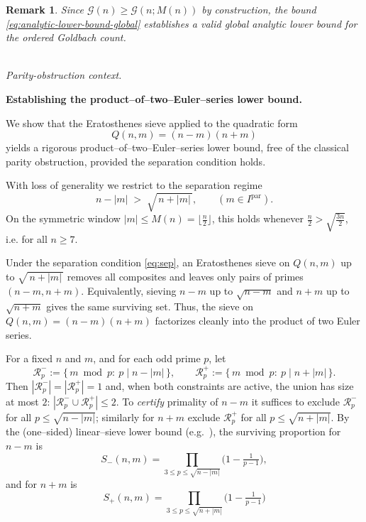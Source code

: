 \documentclass[11pt]{article}
\makeatletter
\theoremstyle{inline}
\newtheorem*{remark}{Remark}
\theoremstyle{break}
\renewenvironment{proof}[1][\proofname]{%
  \par\pushQED{\qed}%
  \normalfont \topsep6\p@\@plus6\p@\relax
  \trivlist
  \item[\hskip\labelsep
        \itshape
    #1\@addpunct{.}]\mbox{}\\  %
}{%
  \popQED\endtrivlist\@endpefalse
}
\theoremstyle{break}
\theoremstyle{break}
\theoremstyle{break}
\theoremstyle{break}
\theoremstyle{break}
\theoremstyle{break}
\theoremstyle{inline}
\makeatother
\begin{document}
\begin{remark}
Since \(\mathcal{G}(n) \ge \mathcal{G}(n;M(n))\) by construction, the bound
\eqref{eq:analytic-lower-bound-global} establishes a valid global
analytic lower bound for the ordered Goldbach count.
\end{remark}

\begin{proof}
\emph{Parity-obstruction context.}

\noindent\textbf{Establishing the product--of--two--Euler--series lower bound.}

We show that the Eratosthenes sieve\cite{FriedlanderIwaniec2010} applied to the quadratic form
\begin{equation}
Q(n,m)=(n-m)(n+m)
\end{equation}
yields a rigorous product--of--two--Euler--series lower bound, free of the
classical parity obstruction\cite{Chen1973, IwaniecKowalski2004}, provided the separation condition holds.

With loss of generality we restrict to the separation regime
\begin{equation}\label{eq:sep}
n-|m|\;>\;\sqrt{\,n+|m|\,}, \qquad (m\in I^{\mathrm{par}}).
\end{equation}
On the symmetric window \(|m|\le M(n)=\lfloor \frac{n}{2} \rfloor\), this holds whenever
\(\frac{n}{2} > \sqrt{\frac{3n}{2}}\), i.e. for all \(n\ge7\).  

Under the separation condition \eqref{eq:sep}, an Eratosthenes sieve on \(Q(n,m)\) up to
\(\sqrt{\,n+|m|\,}\) removes all composites and leaves only pairs of primes
\((n-m,n+m)\). Equivalently, sieving \(n-m\) up to \(\sqrt{n-m}\) and \(n+m\)
up to \(\sqrt{n+m}\) gives the same surviving set.  Thus, the sieve on \(Q(n,m)=(n-m)(n+m)\)
factorizes cleanly into the product of two Euler series.\cite{Vaughan1997}

For a fixed \(n\) and \(m\), and for each odd prime \(p\), let
\begin{equation}
\mathcal R_p^-:=\{\,m\bmod p:\ p\mid n-|m|\,\},\qquad
\mathcal R_p^+:=\{\,m\bmod p:\ p\mid n+|m|\,\}.
\end{equation}
Then \(|\mathcal R_p^-|=|\mathcal R_p^+|=1\) and, when both constraints are active,
the union has size at most \(2\):
\(|\mathcal R_p^-\cup\mathcal R_p^+|\le 2\).
To \emph{certify} primality of \(n\!-\!m\) it suffices to exclude
\(\mathcal R_p^-\) for all \(p\le\sqrt{n-|m|}\); similarly for \(n\!+\!m\)
exclude \(\mathcal R_p^+\) for all \(p\le\sqrt{n+|m|}\).
By the (one–sided) linear–sieve lower bound (e.g.\ \cite[Ch.~6]{IwaniecKowalski2004}),
the surviving proportion for \(n\!-\!m\) is
\begin{equation}
S_-(n,m) = \prod_{3\le p\le \sqrt{n-|m|}}\!\bigl(1-\tfrac{1}{p-1}\bigr),
\end{equation}
and for \(n\!+\!m\) is
\begin{equation}
S_+(n,m) = \prod_{3\le p\le \sqrt{n+|m|}}\!\bigl(1-\tfrac{1}{p-1}\bigr)
\end{equation}


\end{proof}
\end{document}
